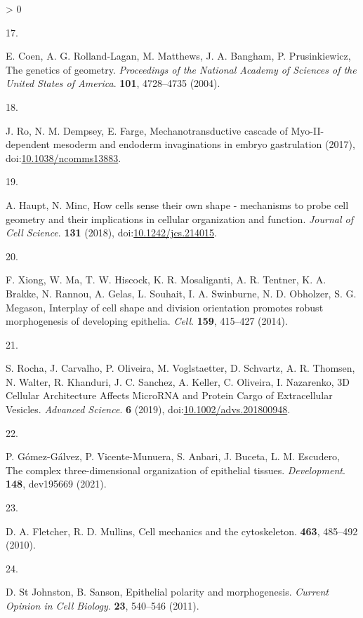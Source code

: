 \documentclass[10pt, b5paper, singlespacinge, twoside]{reedthesis} %
\newlength{\cslhangindent}
\newlength{\csllabelwidth}
\newenvironment{CSLReferences}[3] %
  {%
    \setlength{\parindent}{0pt}
    \ifodd #1 \everypar{\setlength{\hangindent}{\cslhangindent}}\ignorespaces\fi
    \ifnum #2 > 0
    \setlength{\parskip}{#2\baselineskip}
    \fi
  }%
  {}
\newcommand{\CSLLeftMargin}[1]{\parbox[t]{\maxof{\widthof{#1}}{\csllabelwidth}}{#1}}
\newcommand{\CSLRightInline}[1]{\parbox[t]{\linewidth}{#1}}
\theoremstyle{definition}
\theoremstyle{definition}
\theoremstyle{definition}
\theoremstyle{remark}
\begin{document}
\begin{CSLReferences}{0}{0}
\leavevmode\hypertarget{ref-Coen2004}{}%
\CSLLeftMargin{17. }
\CSLRightInline{E. Coen, A. G. Rolland-Lagan, M. Matthews, J. A. Bangham, P. Prusinkiewicz, {The genetics of geometry}. \emph{Proceedings of the National Academy of Sciences of the United States of America}. \textbf{101}, 4728--4735 (2004).}

\leavevmode\hypertarget{ref-Ro2017}{}%
\CSLLeftMargin{18. }
\CSLRightInline{J. Ro, N. M. Dempsey, E. Farge, {Mechanotransductive cascade of Myo-II-dependent mesoderm and endoderm invaginations in embryo gastrulation} (2017), doi:\href{https://doi.org/10.1038/ncomms13883}{10.1038/ncomms13883}.}

\leavevmode\hypertarget{ref-Haupt2018}{}%
\CSLLeftMargin{19. }
\CSLRightInline{A. Haupt, N. Minc, {How cells sense their own shape - mechanisms to probe cell geometry and their implications in cellular organization and function}. \emph{Journal of Cell Science}. \textbf{131} (2018), doi:\href{https://doi.org/10.1242/jcs.214015}{10.1242/jcs.214015}.}

\leavevmode\hypertarget{ref-Xiong2014}{}%
\CSLLeftMargin{20. }
\CSLRightInline{F. Xiong, W. Ma, T. W. Hiscock, K. R. Mosaliganti, A. R. Tentner, K. A. Brakke, N. Rannou, A. Gelas, L. Souhait, I. A. Swinburne, N. D. Obholzer, S. G. Megason, {Interplay of cell shape and division orientation promotes robust morphogenesis of developing epithelia}. \emph{Cell}. \textbf{159}, 415--427 (2014).}

\leavevmode\hypertarget{ref-Rocha2019}{}%
\CSLLeftMargin{21. }
\CSLRightInline{S. Rocha, J. Carvalho, P. Oliveira, M. Voglstaetter, D. Schvartz, A. R. Thomsen, N. Walter, R. Khanduri, J. C. Sanchez, A. Keller, C. Oliveira, I. Nazarenko, {3D Cellular Architecture Affects MicroRNA and Protein Cargo of Extracellular Vesicles}. \emph{Advanced Science}. \textbf{6} (2019), doi:\href{https://doi.org/10.1002/advs.201800948}{10.1002/advs.201800948}.}

\leavevmode\hypertarget{ref-Gomez-Galvez2021}{}%
\CSLLeftMargin{22. }
\CSLRightInline{P. Gómez-Gálvez, P. Vicente-Munuera, S. Anbari, J. Buceta, L. M. Escudero, {The complex three-dimensional organization of epithelial tissues}. \emph{Development}. \textbf{148}, dev195669 (2021).}

\leavevmode\hypertarget{ref-Fletcher2010}{}%
\CSLLeftMargin{23. }
\CSLRightInline{D. A. Fletcher, R. D. Mullins, {Cell mechanics and the cytoskeleton}. \textbf{463}, 485--492 (2010).}

\leavevmode\hypertarget{ref-StJohnston2011}{}%
\CSLLeftMargin{24. }
\CSLRightInline{D. St Johnston, B. Sanson, {Epithelial polarity and morphogenesis}. \emph{Current Opinion in Cell Biology}. \textbf{23}, 540--546 (2011).}


\end{CSLReferences}
\end{document}

